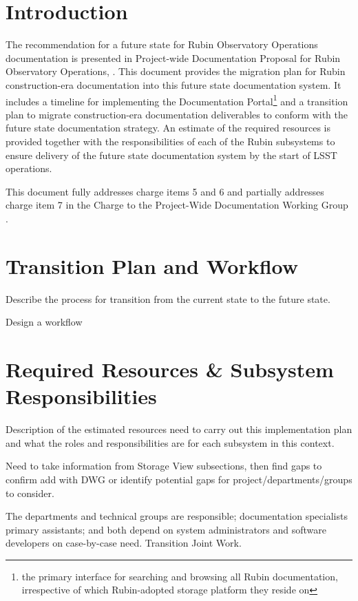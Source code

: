 \section{Introduction}

The recommendation for a future state  for Rubin Observatory Operations documentation is presented in Project-wide Documentation Proposal for Rubin Observatory Operations, . 
This document provides the migration plan for Rubin construction-era documentation into this future state documentation system. 
It includes a timeline for implementing the Documentation Portal\footnote{the  primary interface for searching and browsing all Rubin documentation, irrespective of which Rubin-adopted storage platform they reside on} and a transition plan to migrate construction-era  documentation deliverables to conform with the future state documentation strategy.
An estimate of the required resources is provided together with the responsibilities of each of the Rubin subsystems to ensure delivery of the future state documentation system by the start of LSST operations. 

This document fully addresses charge items 5 and 6 and partially addresses charge item 7 in the Charge to the Project-Wide Documentation Working Group . 


\section{Transition Plan and Workflow}

Describe the process for transition from the current state to the future state.

Design a workflow

\section{Required Resources \& Subsystem Responsibilities}

Description of the estimated resources need to carry out this implementation plan and what the roles and responsibilities are for each subsystem in this context.

Need to take information from Storage View subsections, then find gaps to confirm add with DWG or identify potential gaps for project/departments/groups to consider.

The departments and technical groups are responsible; documentation specialists primary assistants; and both depend on system administrators and software developers on case-by-case need.
Transition Joint Work.

